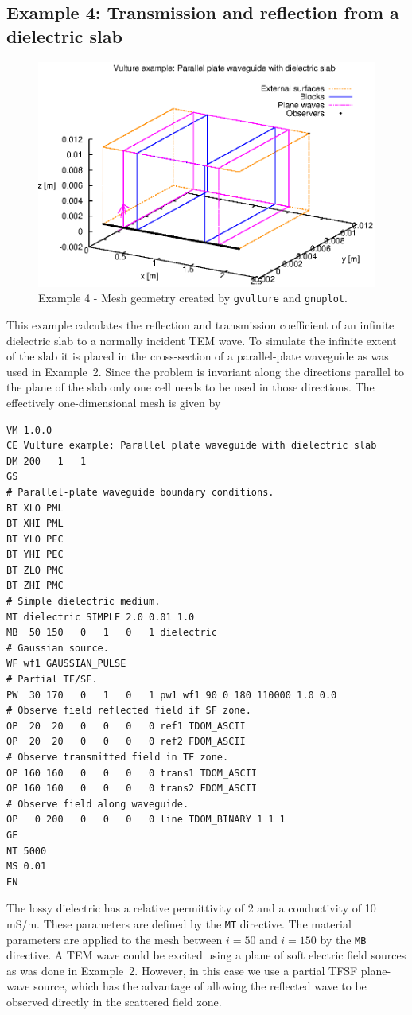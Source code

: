 \documentclass[onecolumn,a4paper]{article}
\numberwithin{equation}{section}
\begin{document}
\subsection{Example 4: Transmission and reflection from a dielectric slab}

\begin{figure}[ht!]
  \centerline{\includegraphics[width=12cm]{figures/parplate1D_dielslab_mesh}}
  \caption{\label{fg:parplate1D_dielslab_mesh} Example 4 - Mesh geometry created by \texttt{gvulture} and \texttt{gnuplot}.}
\end{figure}

This example calculates the reflection and transmission coefficient of an infinite dielectric slab to a normally
incident TEM wave. To simulate the infinite extent of the slab it is placed in the cross-section of 
a parallel-plate waveguide as was used in Example~2. Since the problem is invariant along the directions parallel 
to the plane of the slab only one cell needs to be used in those directions. The 
effectively one-dimensional mesh is given by
\begin{verbatim}
VM 1.0.0
CE Vulture example: Parallel plate waveguide with dielectric slab
DM 200   1   1
GS
# Parallel-plate waveguide boundary conditions.
BT XLO PML
BT XHI PML
BT YLO PEC
BT YHI PEC
BT ZLO PMC
BT ZHI PMC
# Simple dielectric medium.
MT dielectric SIMPLE 2.0 0.01 1.0
MB  50 150   0   1   0   1 dielectric
# Gaussian source.
WF wf1 GAUSSIAN_PULSE
# Partial TF/SF.
PW  30 170   0   1   0   1 pw1 wf1 90 0 180 110000 1.0 0.0
# Observe field reflected field if SF zone.
OP  20  20   0   0   0   0 ref1 TDOM_ASCII
OP  20  20   0   0   0   0 ref2 FDOM_ASCII
# Observe transmitted field in TF zone.
OP 160 160   0   0   0   0 trans1 TDOM_ASCII
OP 160 160   0   0   0   0 trans2 FDOM_ASCII
# Observe field along waveguide.
OP   0 200   0   0   0   0 line TDOM_BINARY 1 1 1
GE
NT 5000
MS 0.01
EN
\end{verbatim}
The lossy dielectric has a relative permittivity of 2 and a conductivity of 10\,mS/m. These
parameters are defined by the \texttt{MT} directive. The material parameters are applied to the mesh
between $i=50$ and $i=150$ by the \texttt{MB} directive. A TEM wave could be excited using
a plane of soft electric field sources as was done in Example~2. However, in this case we
use a partial TFSF plane-wave source, which has the advantage of allowing the reflected 
wave to be observed directly in the scattered field zone.
\end{document}
